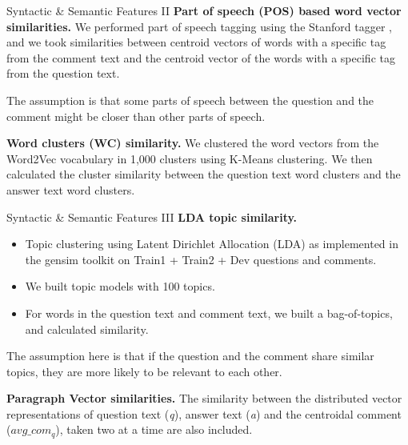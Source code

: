 \documentclass[10pt]{beamer}
\begin{document}
%
%
%

\begin{frame}{Syntactic \& Semantic Features II}
\justify
\textbf{Part of speech (POS) based word vector similarities.} We performed part of speech tagging using the Stanford tagger \cite{toutanova2003feature}, and we took similarities between centroid vectors of words with a specific tag from the comment text and the centroid vector of the words with a specific tag from the question text.

The assumption is that some parts of speech between the question and the comment might be closer than other parts of speech.

\textbf{Word clusters (WC) similarity.} We clustered the word vectors from the Word2Vec vocabulary in 1,000 clusters using K-Means clustering. We then calculated the cluster similarity between the question text word clusters and the answer text word clusters.
\end{frame}

\begin{frame}{Syntactic \& Semantic Features III}
\justify
\textbf{LDA topic similarity.} 
\begin{itemize}
\item Topic clustering using Latent Dirichlet Allocation (LDA) as implemented in the gensim \cite{rehurek2010software} toolkit on Train1 + Train2 + Dev questions and comments. 
\item We built topic models with 100 topics. 
\item For words in the question text and comment text, we built a bag-of-topics, and calculated similarity. 
\end{itemize}
The assumption here is that if the question and the comment share similar topics, they are more likely to be relevant to each other.

\textbf{Paragraph Vector similarities.} The similarity between the distributed vector representations of question text (\textit{q}), answer text (\textit{a}) and the centroidal comment ($avg\_com_q$), taken two at a time are also included.
\end{frame}
\end{document}

